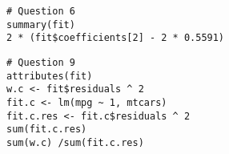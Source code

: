 \begin{frame}[fragile]
\begin{framed}
\begin{verbatim}
# Question 6
summary(fit)
2 * (fit$coefficients[2] - 2 * 0.5591)
\end{verbatim}
\end{framed}
\end{frame}
\begin{frame}[fragile]
\begin{framed}
\begin{verbatim}
# Question 9
attributes(fit)
w.c <- fit$residuals ^ 2
fit.c <- lm(mpg ~ 1, mtcars)
fit.c.res <- fit.c$residuals ^ 2
sum(fit.c.res)
sum(w.c) /sum(fit.c.res)
\end{verbatim}
\end{framed}
\end{frame}
